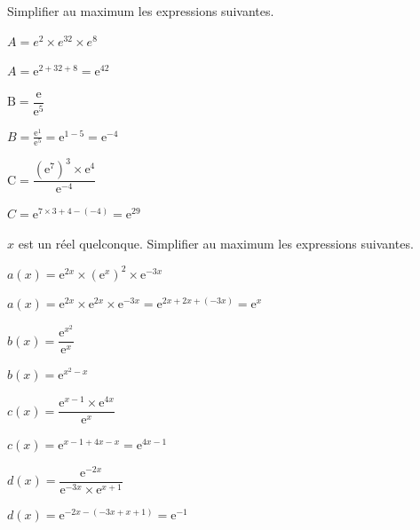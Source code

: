 \documentclass[11pt,a4paper]{article}  %
\begin{document}
Simplifier au maximum les expressions suivantes.
\begin{enumMet}
	\item $A=e^2 \times e^{32} \times e^8$
	\begin{corrBox}
		$A=\mathrm{e}^{2+32+8}=\mathrm{e}^{42}$		
	\end{corrBox}
	\item $\mathrm{B}=\dfrac{\mathrm{e}}{\mathrm{e}^5}$
	\begin{corrBox}
		$B=\frac{\mathrm{e}^1}{\mathrm{e}^5}=\mathrm{e}^{1-5}=\mathrm{e}^{-4}$
	\end{corrBox}
	\item $\mathrm{C}=\dfrac{\left(\mathrm{e}^7\right)^3 \times \mathrm{e}^4}{\mathrm{e}^{-4}}$
	\begin{corrBox}
		$C=\mathrm{e}^{7 \times 3+4-(-4)}=\mathrm{e}^{29}$		
	\end{corrBox}
\end{enumMet}


$x$ est un réel quelconque. Simplifier au maximum les expressions suivantes.
\begin{enumMet}
	\item $a(x)=\mathrm{e}^{2 x} \times\left(\mathrm{e}^x\right)^2 \times \mathrm{e}^{-3 x}$
	\begin{corrBox}
		$a(x)=\mathrm{e}^{2 x} \times \mathrm{e}^{2 x} \times \mathrm{e}^{-3 x}=\mathrm{e}^{2 x+2 x+(-3 x)}=\mathrm{e}^x$
	\end{corrBox}
	\item $b(x)=\dfrac{\mathrm{e}^{x^2}}{\mathrm{e}^x}$
	\begin{corrBox}
		$b(x)=\mathrm{e}^{x^2-x}$
	\end{corrBox}
	\item $c(x)=\dfrac{\mathrm{e}^{x-1} \times \mathrm{e}^{4 x}}{\mathrm{e}^x}$
	\begin{corrBox}
		$c(x)=\mathrm{e}^{x-1+4 x-x}=\mathrm{e}^{4 x-1}$
	\end{corrBox}
	\item $d(x)=\dfrac{\mathrm{e}^{-2 x}}{\mathrm{e}^{-3 x} \times \mathrm{e}^{x+1}}$
	\begin{corrBox}
		$d(x)=\mathrm{e}^{-2 x-(-3 x+x+1)}=\mathrm{e}^{-1}$
	\end{corrBox}
\end{enumMet}



\end{document}
